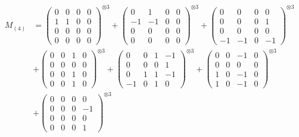 \documentclass{article}
\newcommand{\Mthree}{%
    M_{(4)}
}
\begin{document}
        \newpage
        
        \footnotesize{
        \begin{align}
        \Mthree
        &= \label{Rs16-Rc11-Solution-23-c1} \begin{pmatrix} 0 & 0 & 0 & 0 \\ 1 & 1 & 0 & 0 \\ 0 & 0 & 0 & 0 \\ 0 & 0 & 0 & 0 \end{pmatrix}^{\otimes 3} 
            + \begin{pmatrix} 0 & 1 & 0 & 0 \\ -1 & -1 & 0 & 0 \\ 0 & 0 & 0 & 0 \\ 0 & 0 & 0 & 0 \end{pmatrix}^{\otimes 3} 
            + \begin{pmatrix} 0 & 0 & 0 & 0 \\ 0 & 0 & 0 & 1 \\ 0 & 0 & 0 & 0 \\ -1 & -1 & 0 & -1 \end{pmatrix}^{\otimes 3} \\
        &+ \label{Rs16-Rc11-Solution-23-c4} \begin{pmatrix} 0 & 0 & 1 & 0 \\ 0 & 0 & 0 & 0 \\ 0 & 0 & 1 & 0 \\ 0 & 0 & 1 & 0 \end{pmatrix}^{\otimes 3} 
            + \begin{pmatrix} 0 & 0 & 1 & -1 \\ 0 & 0 & 0 & 1 \\ 0 & 1 & 1 & -1 \\ -1 & 0 & 1 & 0 \end{pmatrix}^{\otimes 3} 
            + \begin{pmatrix} 0 & 0 & -1 & 0 \\ 0 & 0 & 0 & 0 \\ 1 & 0 & -1 & 0 \\ 1 & 0 & -1 & 0 \end{pmatrix}^{\otimes 3} \\
        &+ \label{Rs16-Rc11-Solution-23-c7} \begin{pmatrix} 0 & 0 & 0 & 0 \\ 0 & 0 & 0 & -1 \\ 0 & 0 & 0 & 0 \\ 0 & 0 & 0 & 1 \end{pmatrix}^{\otimes 3} 

\end{align}}
\end{document}
